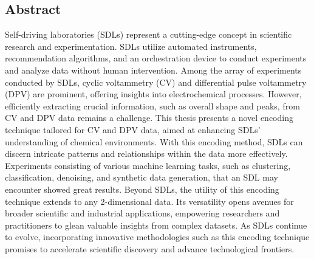 \begin{center}
\chapter*{\centering Abstract} 
\begin{singlespace}
Self-driving laboratories (SDLs) represent a cutting-edge concept in scientific research and experimentation. SDLs utilize automated instruments, recommendation algorithms, and an orchestration device to conduct experiments and analyze data without human intervention. Among the array of experiments conducted by SDLs, cyclic voltammetry (CV) and differential pulse voltammetry (DPV) are prominent, offering insights into electrochemical processes. However, efficiently extracting crucial information, such as overall shape and peaks, from CV and DPV data remains a challenge. This thesis presents a novel encoding technique tailored for CV and DPV data, aimed at enhancing SDLs' understanding of chemical environments. With this encoding method, SDLs can discern intricate patterns and relationships within the data more effectively. Experiments consisting of various machine learning tasks, such as clustering, classification, denoising, and synthetic data generation, that an SDL may encounter showed great results. Beyond SDLs, the utility of this encoding technique extends to any 2-dimensional data. Its versatility opens avenues for broader scientific and industrial applications, empowering researchers and practitioners to glean valuable insights from complex datasets. As SDLs continue to evolve, incorporating innovative methodologies such as this encoding technique promises to accelerate scientific discovery and advance technological frontiers.
\end{singlespace}
\end{center}